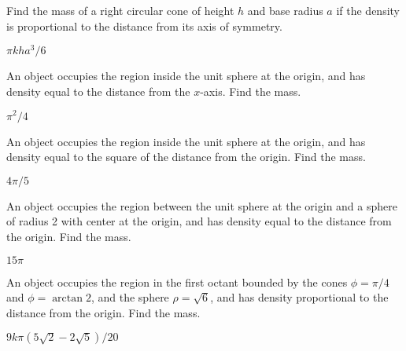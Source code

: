 \begin{exercises}
\exercise Find the mass of a right circular cone of height $h$ and
base radius $a$ if the density is proportional to the distance from
its axis of symmetry.
\begin{answer} $\pi kha^3/6$
\end{answer}

\exercise An object occupies the region inside the unit sphere at the
origin, and has density equal to the distance from the $x$-axis. Find
the mass.
\begin{answer} $\pi^2/4$
\end{answer}

\exercise An object occupies the region inside the unit sphere at the
origin, and has density equal to the square of the distance from the
origin. Find the mass.
\begin{answer} $4\pi/5$
\end{answer}

\exercise An object occupies the region between the unit sphere at the
origin and a sphere of radius 2 with center at the origin, and has
density equal to the distance from the origin. Find the mass.
\begin{answer} $15\pi$
\end{answer}

\exercise An object occupies the region in the first octant bounded by
the cones $\phi = \pi/4$ and $\phi = \arctan 2$, and the sphere $\rho
= \sqrt{6}$, and has density proportional to the distance from the
origin. Find the mass.
\begin{answer} $9k\pi(5\sqrt2-2\sqrt5)/20$
\end{answer}

\end{exercises}

